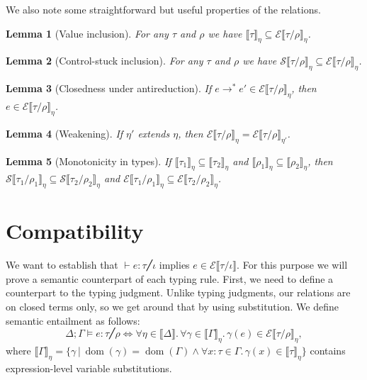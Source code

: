 \documentclass[a4paper, 11pt,titlepage, openright, twoside]{report}
\newcommand{\E}{\mathcal{E}}
\renewcommand{\S}{\mathcal{S}}
\newcommand{\Free}{\textrm{-}\mathrm{free}}
\DeclareMathOperator{\dom}{dom}
\newcommand{\+}{\enspace}
\newtheorem{lemma}{Lemma}
\begin{document}
We also note some straightforward but useful properties of the relations.
\begin{lemma}[Value inclusion]\label{value-inclusion}
	For any $τ$ and $ρ$ we have $⟦τ⟧_η ⊆ \E⟦τ/ρ⟧_η$.
\end{lemma}

\begin{lemma}[Control-stuck inclusion]\label{stuck-inclusion}
For any $τ$ and $ρ$ we have $\S⟦τ/ρ⟧_η ⊆ \E⟦τ/ρ⟧_η$.
\end{lemma}

\begin{lemma}[Closedness under antireduction]\label{antireduction}
If $e →^* e' ∈ \E⟦τ/ρ⟧_η$, then $e∈\E⟦τ/ρ⟧_η$.
\end{lemma}

\begin{lemma}[Weakening]\label{weakening}
	If $η'$ extends $η$,
	then $\E⟦τ/ρ⟧_η = \E⟦τ/ρ⟧_{η'}$.
\end{lemma}

\begin{lemma}[Monotonicity in types]\label{mono}
	If $⟦τ_1⟧_η ⊆ ⟦τ_2⟧_η$ and $⟦ρ_1⟧_η ⊆ ⟦ρ_2⟧_η$,
	then $\S⟦τ_1/ρ_1⟧_η ⊆ \S⟦τ_2/ρ_2⟧_η$
	and $\E⟦τ_1/ρ_1⟧_η ⊆ \E⟦τ_2/ρ_2⟧_η$.
\end{lemma}
%
%
%

\section{Compatibility} %
We want to establish that $⊢ e : τ ╱ ι$ implies $e ∈ \E⟦τ/ι⟧$.
For this purpose we will prove a semantic counterpart of each typing rule.
First, we need to define a counterpart to the typing judgment.
Unlike typing judgments, our relations are on closed terms only,
so we get around that by using substitution.
We define semantic entailment as follows:
$$Δ;Γ ⊨ e : τ ╱ ρ ⇔ ∀η∈⟦Δ⟧.\, ∀γ∈⟦Γ⟧_η.\,γ(e) ∈ \E⟦τ/ρ⟧_η,$$
where $⟦Γ⟧_η = \{ γ │ \dom(γ) = \dom(Γ) ∧ ∀x:τ∈Γ.\,γ(x) ∈ ⟦τ⟧_η\}$ contains expression-level
variable substitutions.
\end{document}
